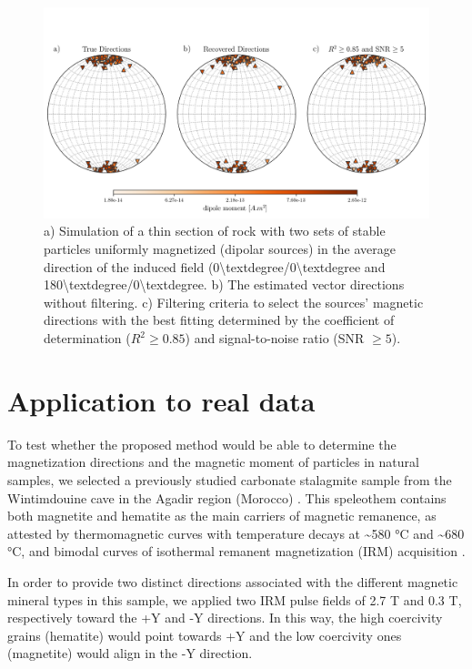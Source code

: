 \begin{figure}[htbp!]
\centering
\includegraphics[width=1\linewidth]{figures/complex-synthetic-stereograms.png}
\caption{
a) Simulation of a thin section of rock with two sets of stable particles uniformly magnetized (dipolar sources) in the average direction of the induced field (0{\textbackslash}textdegree/0{\textbackslash}textdegree and 180{\textbackslash}textdegree/0{\textbackslash}textdegree. b) The estimated vector directions without filtering. c) Filtering criteria to select the sources' magnetic directions with the best fitting determined by the coefficient of determination ($R^ 2 \geq 0.85$) and signal-to-noise ratio (SNR $ \geq 5$).
}
\label{complex-synthetic-stereograms}
\end{figure}



\section{Application to real data}

To test whether the proposed method would be able to determine the
magnetization directions and the magnetic moment of particles in natural
samples, we selected a previously studied carbonate stalagmite sample from the
Wintimdouine cave in the Agadir region (Morocco) \citep{Ait2019Hydro}. This
speleothem contains both magnetite and hematite as the main carriers of
magnetic remanence, as attested by thermomagnetic curves with temperature
decays at {\textasciitilde}580 °C and {\textasciitilde}680 °C, and bimodal
curves of isothermal remanent magnetization (IRM) acquisition \citep{carmo2019speleothem}.

In order to provide two distinct directions associated with the different
magnetic mineral types in this sample, we applied two IRM pulse fields of 2.7 T
and 0.3 T, respectively toward the +Y and -Y directions. In this way, the high
coercivity grains (hematite) would point towards +Y and the low coercivity ones
(magnetite) would align in the -Y direction.

